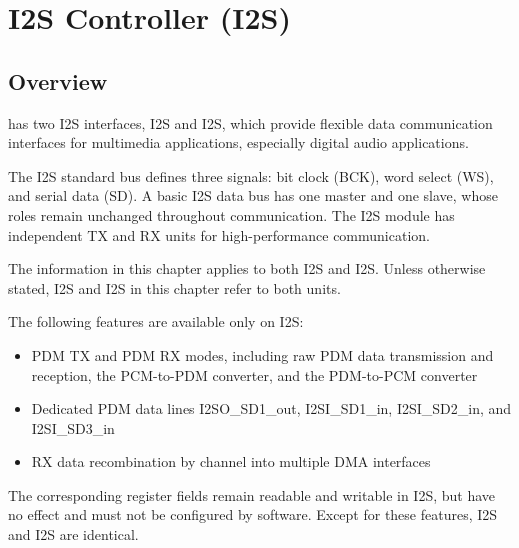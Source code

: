 \documentclass[main\_\_EN.tex]{subfiles}
\begin{document}
\setenglishformatting

\ifglobal
\else
    \clearpage
    \listoftodos
    \listofdonetodos
    \tableofcontents
\fi



\hypertarget{i2s}{}
\chapter{I2S Controller (I2S)}
\label{mod:i2s}

\section{Overview}
\label{sec:i2s-overview}

\chipname{} has two I2S interfaces, I2S and I2S, which provide flexible data communication interfaces for multimedia applications, especially digital audio applications.

The I2S standard bus defines three signals: bit clock (BCK), word select (WS), and serial data (SD). A basic I2S data bus has one master and one slave, whose roles remain unchanged throughout communication. The \chipname{} I2S module has independent TX and RX units for high-performance communication.

\begin{tiplisting}
The information in this chapter applies to both I2S and I2S. Unless otherwise stated, I2S and I2S in this chapter refer to both units.

The following features are available only on I2S:
\begin{itemize}
    \item PDM TX and PDM RX modes, including raw PDM data transmission and reception, the PCM-to-PDM converter, and the PDM-to-PCM converter
    \item Dedicated PDM data lines I2SO\_SD1\_out, I2SI\_SD1\_in, I2SI\_SD2\_in, and I2SI\_SD3\_in
    \item RX data recombination by channel into multiple DMA interfaces
\end{itemize}
The corresponding register fields remain readable and writable in I2S, but have no effect and must not be configured by software. Except for these features, I2S and I2S are identical.
\end{tiplisting}
\end{document}
